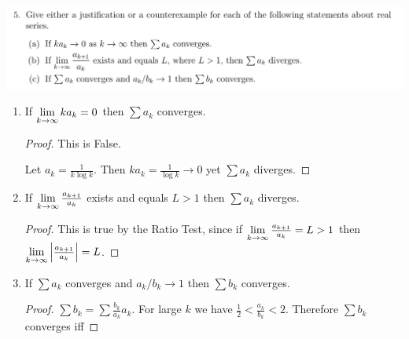\documentclass[12pt]{article}
\begin{document}
\begin{mdframed}
\includegraphics[width=400pt]{img/analysis--oxford-M2-I-6-5.png}
\end{mdframed}

\begin{enumerate}[label=(\alph*)]

\item
  \begin{claim*}
    If $\limk ka_k = 0$ then $\sum a_k$ converges.
  \end{claim*}
  \begin{proof}
    This is False.

    Let $a_k = \frac{1}{k\log k}$. Then $ka_k = \frac{1}{\log k} \to 0$ yet $\sum a_k$ diverges.
  \end{proof}

\item
  \begin{claim*}
    If $\limk \frac{a_{k+1}}{a_k}$ exists and equals $L > 1$ then $\sum a_k$ diverges.
  \end{claim*}
  \begin{proof}
    This is true by the Ratio Test, since if $\limk \frac{a_{k+1}}{a_k} = L > 1$ then\\
    $\limk \Big|\frac{a_{k+1}}{a_k}\Big| = L$.
  \end{proof}

\item
  \begin{claim*}
    If $\sum a_k$ converges and $a_k/b_k \to 1$ then $\sum b_k$ converges.
  \end{claim*}
  \begin{proof}
    $\sum b_k = \sum \frac{b_k}{a_k}a_k$. For large $k$ we have
    $\frac{1}{2} < \frac{a_k}{b_k} < 2$. Therefore $\sum b_k$ converges iff
  \end{proof}


\end{enumerate}
\end{document}
